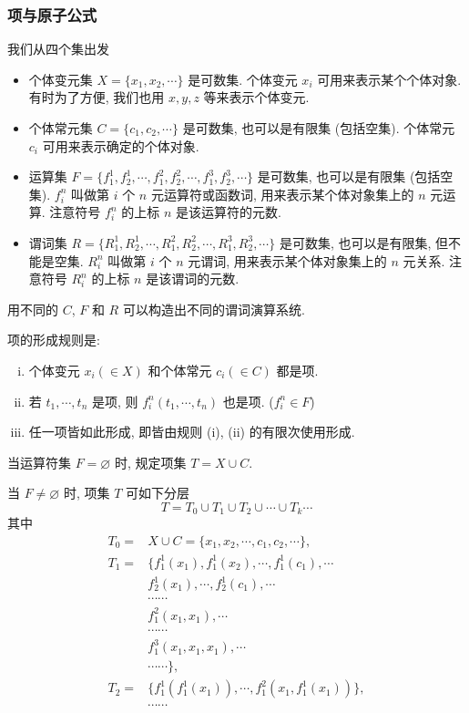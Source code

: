 \documentclass[
    color=black,
    device=normal,
    lang=cn
]{elegantnote}
\begin{document}
\subsubsection{项与原子公式}
我们从四个集出发
\begin{itemize}[listparindent = 2em]
    \item 个体变元集 $X=\{x_1, x_2, \cdots\}$ 是可数集. 个体变元 $x_i$ 可用来表示某个个体对象. 有时为了方便, 我们也用 $x, y, z$ 等来表示个体变元.
    \item 个体常元集 $C=\{c_1, c_2, \cdots\}$ 是可数集, 也可以是有限集 (包括空集). 个体常元 $c_i$ 可用来表示确定的个体对象.
    \item 运算集 $F=\{f_1^1, f_2^1, \cdots, f_1^2, f_2^2, \cdots, f_1^3, f_2^3, \cdots\}$ 是可数集, 也可以是有限集 (包括空集).
          $f_i^n$ 叫做第 $i$ 个 $n$ 元运算符或函数词, 用来表示某个体对象集上的 $n$ 元运算. 注意符号 $f_i^n$ 的上标 $n$ 是该运算符的元数.
    \item 谓词集 $R=\{R_1^1, R_2^1, \cdots, R_1^2, R_2^2, \cdots, R_1^3, R_2^3, \cdots\}$ 是可数集, 也可以是有限集, 但不能是空集.
          $R_i^n$ 叫做第 $i$ 个 $n$ 元谓词, 用来表示某个体对象集上的 $n$ 元关系. 注意符号 $R_i^n$ 的上标 $n$ 是该谓词的元数.
\end{itemize}
用不同的 $C$, $F$ 和 $R$ 可以构造出不同的谓词演算系统.
\begin{definition}[项集 $T$]
    项的形成规则是:
    \begin{enumerate}[(i)]
        \item 个体变元 $x_i (\in X)$ 和个体常元 $c_i (\in C)$ 都是项.
        \item 若 $t_1, \cdots, t_n$ 是项, 则 $f_i^n(t_1, \cdots, t_n)$ 也是项. ($f_i^n\in F$)
        \item 任一项皆如此形成, 即皆由规则 (i), (ii) 的有限次使用形成.
    \end{enumerate}
    当运算符集 $F=\varnothing$ 时, 规定项集 $T=X\cup C$.
\end{definition}
当 $F\neq \varnothing$ 时, 项集 $T$ 可如下分层
$$
    T=T_0\cup T_1\cup T_2\cup \cdots\cup T_k\cdots
$$
其中
$$
    \begin{aligned}
        T_0 = & X\cup C=\{x_1, x_2, \cdots, c_1, c_2, \cdots\},        \\
        T_1 = & \{f_1^1(x_1), f_1^1(x_2), \cdots, f_1^1(c_1),\cdots    \\
              & f_2^1(x_1), \cdots, f_2^1(c_1), \cdots                 \\
              & \cdots\cdots                                           \\
              & f_1^2(x_1, x_1), \cdots                                \\
              & \cdots\cdots                                           \\
              & f_1^3(x_1, x_1, x_1), \cdots                           \\
              & \cdots\cdots\},                                        \\
        T_2 = & \{f_1^1(f_1^1(x_1)), \cdots, f_1^2(x_1, f_1^1(x_1))\}, \\
              & \cdots\cdots
    \end{aligned}
$$
\end{document}
